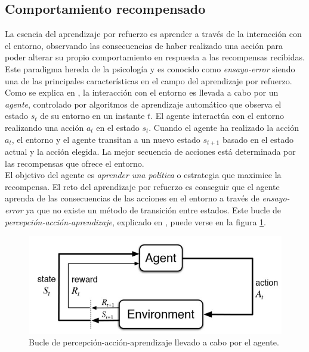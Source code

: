 \subsection{Comportamiento recompensado} \label{comportamiento_recompensado}

\noindent
La esencia del aprendizaje por refuerzo es aprender a través de la interacción con el entorno, observando las consecuencias de haber realizado una acción para poder alterar su propio comportamiento en respuesta a las recompensas recibidas. Este paradigma hereda de la psicología y es conocido como \textit{ensayo-error} siendo una de las principales características en el campo del aprendizaje por refuerzo.\\

Como se explica en \cite{miles_brundage}, la interacción con el entorno es llevada a cabo por un \textit{agente}, controlado por algoritmos de aprendizaje automático que observa el estado $s_t$ de su entorno en un instante $t$. El agente interactúa con el entorno realizando una acción $a_t$ en el estado $s_t$. Cuando el agente ha realizado la acción $a_t$, el entorno y el agente transitan a un nuevo estado $s_{t+1}$ basado en el estado actual y la acción elegida. La mejor secuencia de acciones está determinada por las recompensas que ofrece el entorno.\\

El objetivo del agente es \textit{aprender una política} o estrategia que maximice la recompensa. El reto del aprendizaje por refuerzo es conseguir que el agente aprenda de las consecuencias de las acciones en el entorno a través de \textit{ensayo-error} ya que no existe un método de transición entre estados. Este bucle de \textit{percepción-acción-aprendizaje}, explicado en \cite{miles_brundage}, puede verse en la figura \ref{fig:percepcion-accion-aprendizaje}.

\begin{figure}[!ht]
    \centering \includegraphics[width=0.6\columnwidth]{./figures/chapter_2/reinforcement-learning-diagram.jpg}
    \caption{Bucle de percepción-acción-aprendizaje llevado a cabo por el agente.\label{fig:percepcion-accion-aprendizaje}}
\end{figure}

